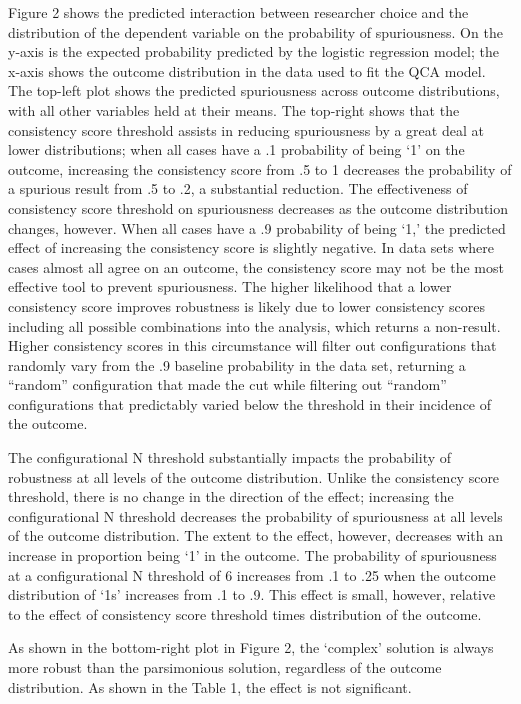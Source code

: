 \documentclass[12pt]{article}
\begin{document}
{Figure 2 shows the predicted interaction between researcher choice and the distribution of the dependent variable on the probability of spuriousness. On the y-axis is the expected probability predicted by the logistic regression model; the x-axis shows the outcome distribution in the data used to fit the QCA model. The top-left plot shows the predicted spuriousness across outcome distributions, with all other variables held at their means. The top-right shows that the consistency score threshold assists in reducing spuriousness by a great deal at lower distributions; when all cases have a .1 probability of being `1' on the outcome, increasing the consistency score from .5 to 1 decreases the probability of a spurious result from .5 to .2, a substantial reduction. The effectiveness of consistency score threshold on spuriousness decreases as the outcome distribution changes, however. When all cases have a .9 probability of being `1,' the predicted effect of increasing the consistency score is slightly negative. In data sets where cases almost all agree on an outcome, the consistency score may not be the most effective tool to prevent spuriousness. The higher likelihood that a lower consistency score improves robustness is likely due to lower consistency scores including all possible combinations into the analysis, which returns a non-result. Higher consistency scores in this circumstance will filter out configurations that randomly vary from the .9 baseline probability in the data set, returning a ``random'' configuration that made the cut while filtering out ``random'' configurations that predictably varied below the threshold in their incidence of the outcome.

The configurational N threshold substantially impacts the probability of robustness at all levels of the outcome distribution. Unlike the consistency score threshold, there is no change in the direction of the effect; increasing the configurational N threshold decreases the probability of spuriousness at all levels of the outcome distribution. The extent to the effect, however, decreases with an increase in proportion being `1' in the outcome. The probability of spuriousness at a configurational N threshold of 6 increases from .1 to .25 when the outcome distribution of `1s' increases from .1 to .9. This effect is small, however, relative to the effect of consistency score threshold times distribution of the outcome.

As shown in the bottom-right plot in Figure 2, the `complex' solution is always more robust than the parsimonious solution, regardless of the outcome distribution. As shown in the Table 1, the effect is not significant. 

}
\end{document}
